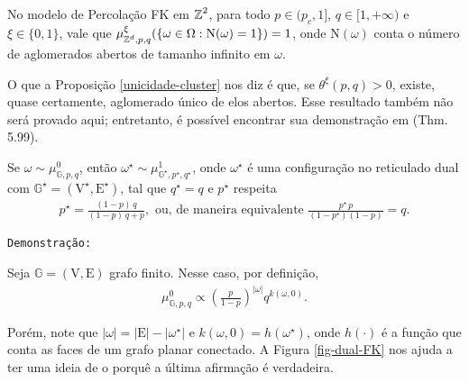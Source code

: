 \begin{mypro} \label{unicidade-cluster}
	No modelo de Percolação FK em $\operatorname{\mathbb{Z}}^2$, para todo $p \in (p_c, 1]$, $q \in [1, +\infty)$ e $\xi \in \{0, 1\}$, vale que $\mu_{\operatorname{\mathbb{Z}}^d, p, q}^{\xi}(\{\omega \in \Omega : \text{N}(\omega) = 1\}) = 1$, onde $\text{N}(\omega)$ conta o número de aglomerados abertos de tamanho infinito em $\omega$. 
\end{mypro}

O que a Proposição \ref{unicidade-cluster} nos diz é que, se $\theta^{\xi}(p, q) > 0$, existe, quase certamente, aglomerado único de elos abertos. Esse resultado também não será provado aqui; entretanto, é possível encontrar sua demonstração em \cite{grimmett2004random} (Thm. 5.99).

\begin{mypro} \label{pro:propto}
	Se $\omega \sim \mu_{\mathbb{G}, p, q}^0$, então $\omega^{\star} \sim \mu_{\mathbb{G}^{\star}, p^{\star}, q^{\star}}^1$, onde $\omega^{\star}$ é uma configuração no reticulado dual com $\mathbb{G}^{\star} = (\text{V}^{\star}, \text{E}^{\star})$, tal que $q^{\star} = q$ e $p^{\star}$ respeita
	\begin{align}\label{p_dual_fk}
	p^{\star} = \frac{(1 - p) \, q}{(1 - p) \, q + p}, \text{ ou, de maneira equivalente } \frac{p^{\star} \, p}{(1 - p^{\star})(1 - p)} = q.
	\end{align}
\end{mypro}

\texttt{Demonstração:}

Seja $\mathbb{G} = (\text{V}, \text{E})$ grafo finito. Nesse caso, por definição, 
\begin{align} \label{eq:propto}
\mu_{\mathbb{G}, p, q}^0 \propto \left(\frac{p}{1 - p}\right)^{|\omega|} q^{k(\omega, 0)}.
\end{align}

Porém, note que $|\omega| = |\text{E}| - |\omega^{\star}|$ e $k(\omega, 0) = h(\omega^{\star})$, onde $h(\cdot)$ é a função que conta as faces de um grafo planar conectado. A Figura \ref{fig-dual-FK} nos ajuda a ter uma ideia de o porquê a última afirmação é verdadeira. 

\begin{figure*}[!htbp]
	\centering
	
	\caption{Configuração $\omega$ definida em $\mathbb{G}$ (linha sólida) e configuração correspondente $\omega^{\star}$ definida em $\mathbb{G}^{\star}$ (linha tracejada).}
	\label{fig-dual-FK}
\end{figure*}

